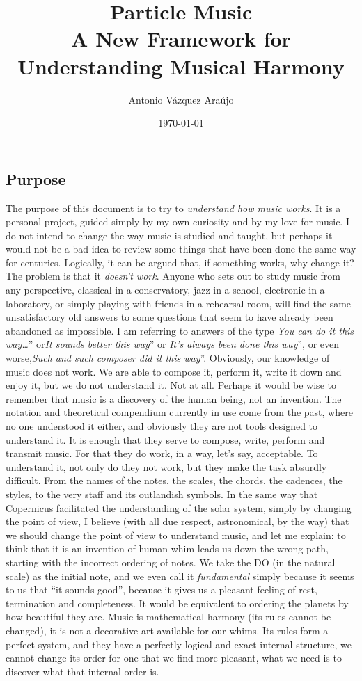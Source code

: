 \documentclass[]{report}
\title{Particle Music \\[1ex] \large A New Framework for Understanding Musical Harmony}
\author{Antonio Vázquez Araújo}
\date{\today}
\begin{document}
\maketitle

\tableofcontents



\subsection{Purpose}
The purpose of this document is to try to \emph{understand how music works}. It is a personal project, guided simply by my own curiosity and by my love for music. I do not intend to change the way music is studied and taught, but perhaps it would not be a bad idea to review some things that have been done the same way for centuries.
Logically, it can be argued that, if something works, why change it? The problem is that it \emph{doesn't work}. Anyone who sets out to study music from any perspective, classical in a conservatory, jazz in a school, electronic in a laboratory, or simply playing with friends in a rehearsal room, will find the same unsatisfactory old answers to some questions that seem to have already been abandoned as impossible.
I am referring to answers of the type \emph{You can do it this way\ldots{}}'' or\emph{It sounds better this way}'' or \emph{It's always been done this way}'', or even worse,\emph{Such and such composer did it this way}''. Obviously, our knowledge of music does not work. We are able to compose it, perform it, write it down and enjoy it, but we do not understand it. Not at all.
Perhaps it would be wise to remember that music is a discovery of the human being, not an invention.
The notation and theoretical compendium currently in use come from the past, where no one understood it either, and obviously they are not tools designed to understand it. It is enough that they serve to compose, write, perform and transmit music. For that they do work, in a way, let's say, acceptable.
To understand it, not only do they not work, but they make the task absurdly difficult. From the names of the notes, the scales, the chords, the cadences, the styles, to the very staff and its outlandish symbols.
In the same way that Copernicus facilitated the understanding of the solar system, simply by changing the point of view, I believe (with all due respect, astronomical, by the way) that we should change the point of view to understand music, and let me explain: to think that it is an invention of human whim leads us down the wrong path, starting with the incorrect ordering of notes. We take the DO (in the natural scale) as the initial note, and we even call it \emph{fundamental} simply because it seems to us that ``it sounds good'', because it gives us a pleasant feeling of rest, termination and completeness.
It would be equivalent to ordering the planets by how beautiful they are.
Music is mathematical harmony (its rules cannot be changed), it is not a decorative art available for our whims. Its rules form a perfect system, and they have a perfectly logical and exact internal structure, we cannot change its order for one that we find more pleasant, what we need is to discover what that internal order is.
\end{document}
